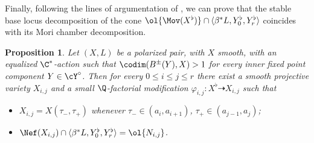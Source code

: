 \documentclass[reqno]{amsproc}
\newtheorem{proposition}[theorem]{Proposition}
\theoremstyle{definition}
\begin{document}
Finally, following the lines of argumentation of \cite[Proposition 4.11]{WORS3}, we can prove  that the stable base locus decomposition of the cone $\ol{\Mov(X^\flat)}\cap \langle \beta^* L,Y^\flat_0,Y^\flat_r\rangle$  coincides with its Mori chamber decomposition. 

\begin{proposition}\label{prop:WORS3}
Let $(X,L)$ be a polarized pair, with $X$ smooth,  with an equalized $\C^*$-action such that  $\codim(B^\pm(Y),X)>1$ for every inner fixed point component $Y\in\cY^\circ$.
Then for every $0 \le i \le j \le r$ there exist a smooth projective variety $X_{i,j}$ and a small $\Q$-factorial modification $\varphi_{i,j}:X^{\flat}\dashrightarrow X_{i,j}$ such that
\begin{itemize}
\item $X_{i,j}=X(\tau_-,\tau_+)$ whenever $\tau_-\in(a_i,a_{i+1})$, $\tau_+\in (a_{j-1},a_j)$; 
\item $\Nef(X_{i,j})\cap \langle \beta^* L,Y^\flat_0,Y^\flat_r\rangle=\ol{N_{i,j}}$.
\end{itemize}
\end{proposition} 
\end{document}
